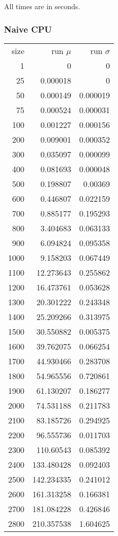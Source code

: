 All times are in seconds.

\subsubsection{Naive CPU}

\begin{longtable}{r r r}
size & run $\mu$ & run $\sigma$ \\
1 & 0 & 0 \\
25 & 0.000018 & 0 \\
50 & 0.000149 & 0.000019 \\
75 & 0.000524 & 0.000031 \\
100 & 0.001227 & 0.000156 \\
200 & 0.009001 & 0.000352 \\
300 & 0.035097 & 0.000099 \\
400 & 0.081693 & 0.000048 \\
500 & 0.198807 & 0.00369 \\
600 & 0.446807 & 0.022159 \\
700 & 0.885177 & 0.195293 \\
800 & 3.404683 & 0.063133 \\
900 & 6.094824 & 0.095358 \\
1000 & 9.158203 & 0.067449 \\
1100 & 12.273643 & 0.255862 \\
1200 & 16.473761 & 0.053628 \\
1300 & 20.301222 & 0.243348 \\
1400 & 25.209266 & 0.313975 \\
1500 & 30.550882 & 0.005375 \\
1600 & 39.762075 & 0.066254 \\
1700 & 44.930466 & 0.283708 \\
1800 & 54.965556 & 0.720861 \\
1900 & 61.130207 & 0.186277 \\
2000 & 74.531188 & 0.211783 \\
2100 & 83.185726 & 0.294925 \\
2200 & 96.555736 & 0.011703 \\
2300 & 110.60543 & 0.085392 \\
2400 & 133.480428 & 0.092403 \\
2500 & 142.234335 & 0.241012 \\
2600 & 161.313258 & 0.166381 \\
2700 & 181.084228 & 0.426846 \\
2800 & 210.357538 & 1.604625 \\

\end{longtable}
